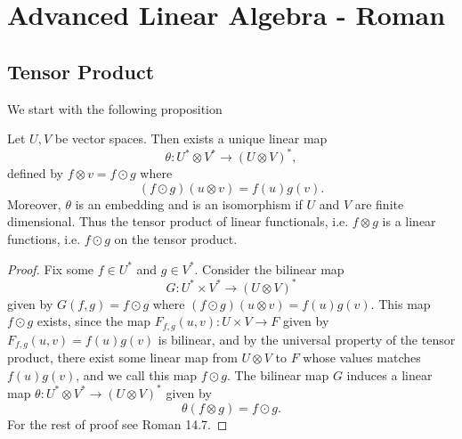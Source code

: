 \chapter{Advanced Linear Algebra - Roman}

\section{Tensor Product}

We start with the following proposition
\begin{proposition}
	Let $ U,V $ be vector spaces. Then exists a unique linear map 
	\[ \theta: U^* \otimes V^* \to (U\otimes V)^*, \]
	defined by $ f\otimes v = f\odot g $ where
	\[ (f\odot g)(u\otimes v) = f(u)g(v).  \]
	Moreover, $ \theta $ is an embedding and is an isomorphism if $ U $ and $ V $ are finite dimensional. Thus the tensor product of linear functionals, i.e. $ f\otimes g $ is a linear functions, i.e. $ f\odot g $ on the tensor product.
\end{proposition}

\begin{proof}
	Fix some $ f \in U^* $ and $ g\in V^* $. Consider the bilinear map
	\[ G: U^* \times V^* \to (U\otimes V)^*  \]
	given by $ G(f,g) = f\odot g $ where $ (f\odot g) (u\otimes v) = f(u)g(v) $. This map $ f\odot g $ exists, since the map $ F_{f,g}(u,v): U\times V \to F $ given by $ F_{f,g}(u,v) = f(u)g(v) $ is bilinear, and by the universal property of the tensor product, there exist some linear map from $ U\otimes V $ to $ F $ whose values matches $ f(u)g(v) $, and we call this map $ f\odot g $. The bilinear map $ G $ induces a linear map $ \theta: U^*\otimes V^* \to (U\otimes V)^* $ given by 
	\[ \theta(f\otimes g) = f\odot g.  \]
	For the rest of proof see Roman 14.7.
\end{proof}